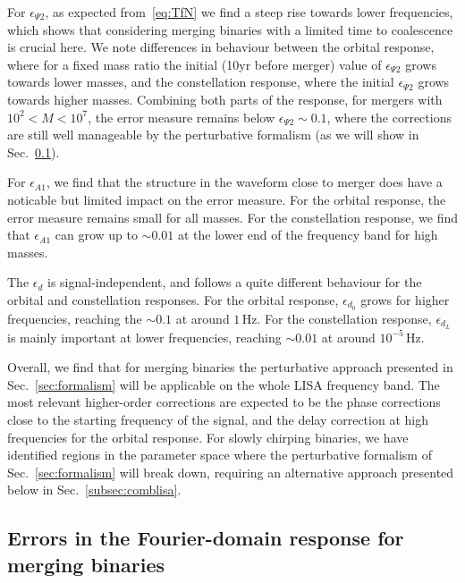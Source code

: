 \documentclass[aps,showpacs,twocolumn,
prd,superscriptaddress,nofootinbib]{revtex4-1}
\newcommand{\Hz}{\,\mathrm{Hz}}
\begin{document}
For $\epsilon_{\Psi 2}$, as expected from~\eqref{eq:TfN} we find a steep rise towards lower frequencies, which shows that considering merging binaries with a limited time to coalescence is crucial here. We note differences in behaviour between the orbital response, where for a fixed mass ratio the initial (10yr before merger) value of $\epsilon_{\Psi 2}$ grows towards lower masses, and the constellation response, where the initial $\epsilon_{\Psi 2}$ grows towards higher masses. Combining both parts of the response, for mergers with $10^2<M<10^7$, the error measure remains below $\epsilon_{\Psi 2} \sim 0.1$, where the corrections are still well manageable by the perturbative formalism (as we will show in Sec.~\ref{subsec:errorsLISA}).

For $\epsilon_{A1}$, we find that the structure in the waveform close to merger does have a noticable but limited impact on the error measure. For the orbital response, the error measure remains small for all masses. For the constellation response, we find that $\epsilon_{A1}$ can grow up to $\sim 0.01$ at the lower end of the frequency band for high masses.

The $\epsilon_{d}$ is signal-independent, and follows a quite different behaviour for the orbital and constellation responses. For the orbital response, $\epsilon_{d_{0}}$ grows for higher frequencies, reaching the $\sim 0.1$ at around $1\Hz$. For the constellation response, $\epsilon_{d_{L}}$ is mainly important at lower frequencies, reaching $\sim 0.01$ at around $10^{-5}\Hz$.

Overall, we find that for merging binaries the perturbative approach presented in Sec.~\ref{sec:formalism} will be applicable on the whole LISA frequency band. The most relevant higher-order corrections are expected to be the phase corrections close to the starting frequency of the signal, and the delay correction at high frequencies for the orbital response. For slowly chirping binaries, we have identified regions in the parameter space where the perturbative formalism of Sec.~\ref{sec:formalism} will break down, requiring an alternative approach presented below in Sec.~\ref{subsec:comblisa}.


\subsection{Errors in the Fourier-domain response for merging binaries}
\label{subsec:errorsLISA}
\end{document}
